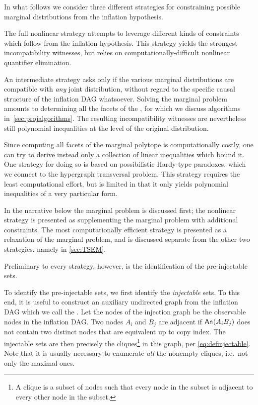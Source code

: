 
In what follows we consider three different strategies for constraining possible marginal distributions from the inflation hypothesis. 
\begin{compactitem}
\item The full nonlinear strategy attempts to leverage different kinds of constraints which follow from the inflation hypothesis. This strategy yields the strongest incompatibility witnesses, but relies on computationally-difficult nonlinear quantifier elimination.
\item An intermediate strategy asks only if the various marginal distributions are compatible with \emph{any} joint distribution, without regard to the specific causal structure of the inflation DAG whatsoever. Solving the marginal problem amounts to determining all the facets of the , for which we discuss algorithms in~\cref{sec:projalgorithms}. The resulting incompatibility witnesses are nevertheless still polynomial inequalities at the level of the original distribution.
\item Since computing all facets of the marginal polytope is computationally costly, one can try to derive instead only a collection of linear inequalities which bound it. One strategy for doing so is based on possibilistic Hardy-type paradoxes, which we connect to the hypergraph transversal problem. This strategy requires the least computational effort, but is limited in that it only yields polynomial inequalities of a very particular form.
\end{compactitem}

In the narrative below the marginal problem is discussed first; the nonlinear strategy is presented as supplementing the marginal problem with additional constraints. The most computationally efficient strategy is presented as a relaxation of the marginal problem, and is discussed separate from the other two strategies, namely in \cref{sec:TSEM}.

Preliminary to every strategy, however, is the identification of the pre-injectable sets.


\label{step:findpreinjectable}

To identify the pre-injectable sets, we first identify the \emph{injectable} sets. To this end, it is useful to construct an auxiliary undirected graph from the inflation DAG which we call the . Let the nodes of the injection graph be the observable nodes in the inflation DAG. Two nodes $A_i$ and $B_j$ are adjacent if  ${\mathsf{An}_{}}\lparen A_i B_j\rparen$ does not contain two distinct nodes that are equivalent up to copy index. The injectable sets are then precisely the cliques\footnote{A clique is a subset of nodes such that every node in the subset is adjacent to every other node in the subset.} in this graph, per \cref{eq:definjectable}. Note that it is usually necessary to enumerate \emph{all} the nonempty cliques, i.e.~not only the maximal ones.

